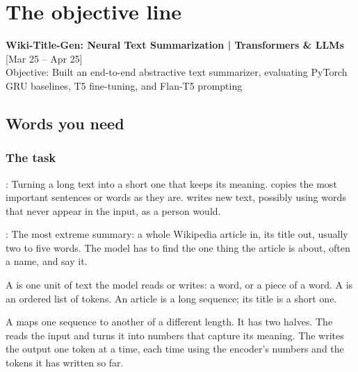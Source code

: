 \chapter{The objective line}
\label{ch:objective}

\begin{cvline}
\textbf{Wiki-Title-Gen: Neural Text Summarization | Transformers \& LLMs} \hfill [Mar 25 -- Apr 25]\\
Objective: Built an end-to-end abstractive text summarizer, evaluating PyTorch GRU baselines, T5 fine-tuning, and Flan-T5 prompting
\end{cvline}

\section{Words you need}

\subsection*{The task}

\begin{definition}
: Turning a long text into a short one that keeps its meaning.  copies the most important sentences or words as they are.  writes new text, possibly using words that never appear in the input, as a person would.
\end{definition}

\begin{definition}
: The most extreme summary: a whole Wikipedia article in, its title out, usually two to five words. The model has to find the one thing the article is about, often a name, and say it.
\end{definition}

\begin{definition}
A  is one unit of text the model reads or writes: a word, or a piece of a word. A  is an ordered list of tokens. An article is a long sequence; its title is a short one.
\end{definition}

\begin{definition}
A  maps one sequence to another of a different length. It has two halves. The  reads the input and turns it into numbers that capture its meaning. The  writes the output one token at a time, each time using the encoder's numbers and the tokens it has written so far.
\end{definition}

